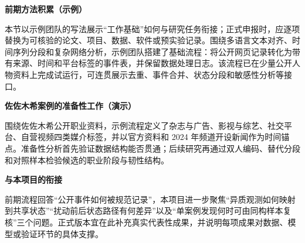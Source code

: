 \GXNSFBodyText

\noindent\textbf{前期方法积累（示例）}\par
本节以示例团队的写法展示“工作基础”如何与研究任务衔接；正式申报时，应逐项替换为可核验的论文、项目、数据、软件或预实验记录。围绕多语言文本对齐、时间序列分段和复杂网络分析，示例团队搭建了基础流程：将公开网页记录转化为带有来源、时间和平台标签的事件表，并保留数据处理日志。该流程已在少量公开人物资料上完成试运行，可连贯展示去重、事件合并、状态分段和敏感性分析等接口。

\noindent\textbf{佐佐木希案例的准备性工作（演示）}\par
围绕佐佐木希公开职业资料，示例流程定义了杂志与广告、影视与综艺、社交平台、自营视频四类媒介标签，并以官方资料和 2024 年频道开设新闻作为时间锚点。准备性分析首先验证数据结构能否贯通；后续研究再通过双人编码、替代分段和对照样本检验候选的职业阶段与韧性结构。

\noindent\textbf{与本项目的衔接}\par
前期流程回答“公开事件如何被规范记录”，本项目进一步聚焦“异质观测如何映射到共享状态”“扰动前后状态路径有何差异”以及“单案例发现何时可由同构样本复核”三个问题。正式版本宜在此补充真实代表性成果，并说明每项成果对数据、模型或验证环节的具体支撑。
